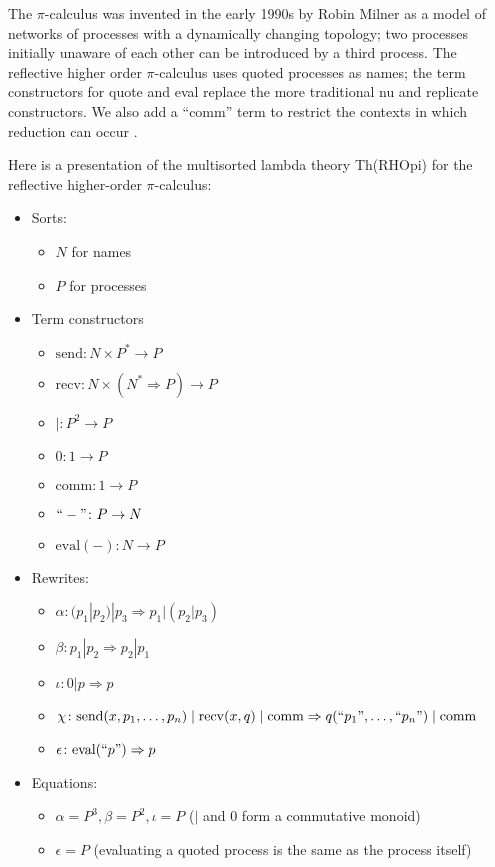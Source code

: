 \documentclass{llncs}
\newcommand{\maps}{\colon}
\newcommand{\send}{\mathrm{send}}
\newcommand{\recv}{\mathrm{recv}}
\newcommand{\comm}{\mathrm{comm}}
\renewcommand{\quote}[1]{``#1"}
\newcommand{\deref}[1]{\mathrm{eval}(#1)}
\begin{document}
The $\pi$-calculus was invented in the early 1990s by Robin Milner as a model of networks of processes with a dynamically changing topology; two processes initially unaware of each other can be introduced by a third process.  The reflective higher order $\pi$-calculus uses quoted processes as names; the term constructors for quote and eval replace the more traditional nu and replicate constructors.  We also add a ``comm'' term to restrict the contexts in which reduction can occur \cite{DBLP:journals/corr/StayM15}.

Here is a presentation of the multisorted lambda theory Th(RHOpi) for the reflective higher-order $\pi$-calculus:
\begin{itemize}
  \item Sorts:
  \begin{itemize}
    \item $N$ for names
    \item $P$ for processes
  \end{itemize}
  \item Term constructors
  \begin{itemize}
    \item $\send\maps N \times P^* \to P$
    \item $\recv\maps N \times (N^* \Rightarrow P) \to P$
    \item $|\maps P^2 \to P$
    \item $0\maps 1 \to P$
    \item $\comm\maps 1 \to P$
    \item $\quote{-}\maps P \to N$
    \item $\deref{-}\maps N \to P$
  \end{itemize}
  \item Rewrites:
  \begin{itemize}
    \item $\alpha\maps (p_1 | p_2) | p_3 \Rightarrow p_1 | (p_2 | p_3)$
    \item $\beta\maps p_1 | p_2 \Rightarrow p_2 | p_1$
    \item $\iota\maps 0 | p \Rightarrow p$
    \item $\chi\maps \send(x, p_1, \ldots, p_n) \;|\; \recv(x, q) \;|\; \comm \Rightarrow q(\quote{p_1}, \ldots, \quote{p_n}) \;|\; \comm$
    \item $\epsilon\maps \deref{\quote{p}} \Rightarrow p$
  \end{itemize}
  \item Equations:
  \begin{itemize}
    \item $\alpha = P^3, \beta = P^2, \iota = P$ ($|$ and 0 form a commutative monoid)
    \item $\epsilon = P$ (evaluating a quoted process is the same as the process itself)
  \end{itemize}
\end{itemize}
\end{document}
